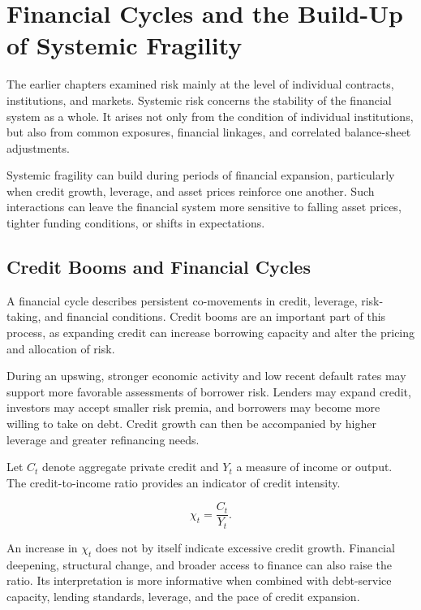\section{Financial Cycles and the Build-Up of Systemic Fragility}

The earlier chapters examined risk mainly at the level of individual contracts, institutions, and markets. Systemic risk concerns the stability of the financial system as a whole. It arises not only from the condition of individual institutions, but also from common exposures, financial linkages, and correlated balance-sheet adjustments.

Systemic fragility can build during periods of financial expansion, particularly when credit growth, leverage, and asset prices reinforce one another. Such interactions can leave the financial system more sensitive to falling asset prices, tighter funding conditions, or shifts in expectations.

\subsection{Credit Booms and Financial Cycles}

A financial cycle describes persistent co-movements in credit, leverage, risk-taking, and financial conditions. Credit booms are an important part of this process, as expanding credit can increase borrowing capacity and alter the pricing and allocation of risk.

During an upswing, stronger economic activity and low recent default rates may support more favorable assessments of borrower risk. Lenders may expand credit, investors may accept smaller risk premia, and borrowers may become more willing to take on debt. Credit growth can then be accompanied by higher leverage and greater refinancing needs.

Let \(C_t\) denote aggregate private credit and \(Y_t\) a measure of income or output. The credit-to-income ratio provides an indicator of credit intensity.

\begin{equation}
\chi_t=\frac{C_t}{Y_t}.
\label{eq:ch21-credit-income-ratio}
\end{equation}

An increase in \(\chi_t\) does not by itself indicate excessive credit growth. Financial deepening, structural change, and broader access to finance can also raise the ratio. Its interpretation is more informative when combined with debt-service capacity, lending standards, leverage, and the pace of credit expansion.

